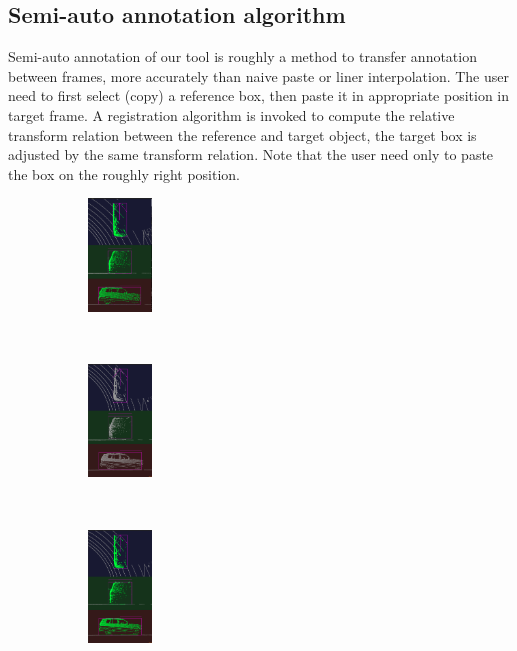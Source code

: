 \documentclass[letterpaper, 10 pt, conference]{ieeeconf}  %
\begin{document}
\subsection{Semi-auto annotation algorithm}

Semi-auto annotation of our tool is roughly a method to transfer annotation between frames, more accurately than naive paste or liner interpolation. The user need to first select (copy) a reference box, then paste it in appropriate position in target frame. A registration algorithm is invoked to compute the relative transform relation between the reference and target object, the target box is adjusted by the same transform relation. Note that the user need only to paste the box on the roughly right position.


\begin{figure}[ht]
	\centering
	\begin{subfigure}[t]{0.18\linewidth}
		\includegraphics[height=3cm]{./figures/reg-ref-3d}\\
		\caption{}\label{fig:box-ref}
	\end{subfigure}\hfill
	~
	\begin{subfigure}[t]{0.18\linewidth}
		\includegraphics[height=3cm]{./figures/reg-input-3d}\\
		\caption{}\label{fig:box-source}
	\end{subfigure}\hfill
	~
	\begin{subfigure}[t]{0.18\linewidth}
		\includegraphics[height=3cm]{./figures/reg-result-3d}\\
		\caption{}\label{fig:box-output}
	\end{subfigure}\hfill
	

\end{figure}
\end{document}

